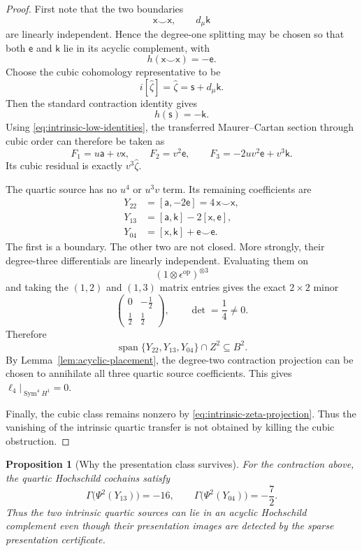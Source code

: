 \documentclass[11pt]{amsart}
\newtheorem{proposition}[theorem]{Proposition}
\newcommand{\Span}{\operatorname{span}}
\begin{document}
\begin{proof}
First note that the two boundaries
\[
\mathsf x\smile\mathsf x,
\qquad
d_\mu\mathsf k
\]
are linearly independent.  Hence the degree-one splitting may be chosen so that both $\mathsf e$ and $\mathsf k$ lie in its acyclic complement, with
\[
h(\mathsf x\smile\mathsf x)=-\mathsf e.
\]
Choose the cubic cohomology representative to be
\[
i[\widehat\zeta]=\widehat\zeta=\mathsf s+d_\mu\mathsf k.
\]
Then the standard contraction identity gives
\[
h(\mathsf s)=-\mathsf k.
\]
Using \eqref{eq:intrinsic-low-identities}, the transferred Maurer--Cartan section through cubic order can therefore be taken as
\[
F_1=u\mathsf a+v\mathsf x,
\qquad
F_2=v^2\mathsf e,
\qquad
F_3=-2uv^2\mathsf e+v^3\mathsf k.
\]
Its cubic residual is exactly $v^3\widehat\zeta$.

The quartic source has no $u^4$ or $u^3v$ term.  Its remaining coefficients are
\begin{align*}
Y_{22}&=[\mathsf a,-2\mathsf e]
      =4\,\mathsf x\smile\mathsf x,\\
Y_{13}&=[\mathsf a,\mathsf k]-2[\mathsf x,\mathsf e],\\
Y_{04}&=[\mathsf x,\mathsf k]+\mathsf e\smile\mathsf e.
\end{align*}
The first is a boundary.  The other two are not closed.  More strongly, their degree-three differentials are linearly independent.  Evaluating them on
\[
(1\otimes\epsilon^{\mathrm{op}})^{\otimes3}
\]
and taking the $(1,2)$ and $(1,3)$ matrix entries gives the exact $2\times2$ minor
\[
\begin{pmatrix}
0&-\tfrac12\\[2pt]
\tfrac12&\tfrac12
\end{pmatrix},
\qquad
\det=\frac14\ne0.
\]
Therefore
\[
\Span\{Y_{22},Y_{13},Y_{04}\}\cap Z^2
\subseteq B^2.
\]
By Lemma~\ref{lem:acyclic-placement}, the degree-two contraction projection can be chosen to annihilate all three quartic source coefficients.  This gives
$\ell_4|_{\operatorname{Sym}^4H^1}=0$.

Finally, the cubic class remains nonzero by \eqref{eq:intrinsic-zeta-projection}.  Thus the vanishing of the intrinsic quartic transfer is not obtained by killing the cubic obstruction.
\end{proof}

\begin{proposition}[Why the presentation class survives]\label{prop:intrinsic-presentation-gap}
For the contraction above, the quartic Hochschild cochains satisfy
\[
\Gamma\bigl(\Psi^2(Y_{13})\bigr)=-16,
\qquad
\Gamma\bigl(\Psi^2(Y_{04})\bigr)=-\frac72.
\]
Thus the two intrinsic quartic sources can lie in an acyclic Hochschild complement even though their presentation images are detected by the sparse presentation certificate.
\end{proposition}
\end{document}
